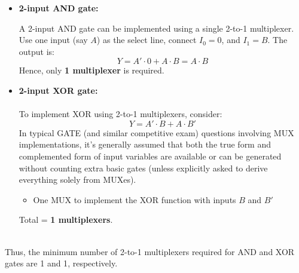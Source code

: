 \documentclass[a4paper,12pt]{article}
\begin{document}
\begin{itemize}
    \item \textbf{2-input AND gate:} \\
\vspace{0.5em}

    A 2-input AND gate can be implemented using a single 2-to-1 multiplexer. Use one input (say $A$) as the select line, connect $I_0 = 0$, and $I_1 = B$. The output is:
    \[
    Y = A' \cdot 0 + A \cdot B = A \cdot B
    \]
    Hence, only \textbf{1 multiplexer} is required.
\vspace{0.5em}
    \item \textbf{2-input XOR gate:} \\
\vspace{0.5em}\\
    To implement XOR using 2-to-1 multiplexers, consider:
    \[
    Y = A' \cdot B + A \cdot B'
    \]
 In typical GATE (and similar competitive exam) questions involving MUX implementations, it's generally assumed that both the true form  and complemented form  of input variables are available or can be generated without counting extra basic gates (unless explicitly asked to derive everything solely from MUXes).
    \begin{itemize}
      
        \item One MUX to implement the XOR function with inputs $B$ and $B'$
    \end{itemize}
    Total = \textbf{1 multiplexers}.
\end{itemize}\\
Thus, the minimum number of 2-to-1 multiplexers required for AND and XOR gates are {1 and 1}, respectively.
\end{document}
